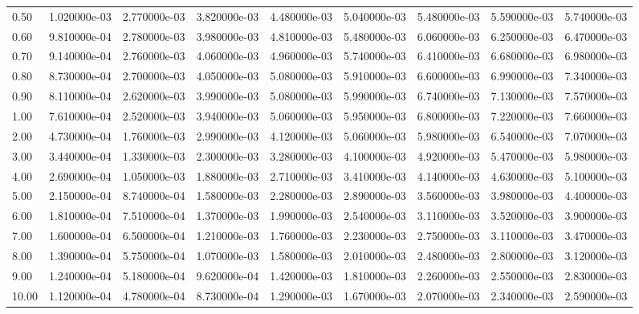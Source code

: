 \begin{tabular}{lrrrrrrrr}
0.50  &  1.020000e-03 &  2.770000e-03 &  3.820000e-03 &  4.480000e-03 &  5.040000e-03 &  5.480000e-03 &  5.590000e-03 &  5.740000e-03 \\
0.60  &  9.810000e-04 &  2.780000e-03 &  3.980000e-03 &  4.810000e-03 &  5.480000e-03 &  6.060000e-03 &  6.250000e-03 &  6.470000e-03 \\
0.70  &  9.140000e-04 &  2.760000e-03 &  4.060000e-03 &  4.960000e-03 &  5.740000e-03 &  6.410000e-03 &  6.680000e-03 &  6.980000e-03 \\
0.80  &  8.730000e-04 &  2.700000e-03 &  4.050000e-03 &  5.080000e-03 &  5.910000e-03 &  6.600000e-03 &  6.990000e-03 &  7.340000e-03 \\
0.90  &  8.110000e-04 &  2.620000e-03 &  3.990000e-03 &  5.080000e-03 &  5.990000e-03 &  6.740000e-03 &  7.130000e-03 &  7.570000e-03 \\
1.00  &  7.610000e-04 &  2.520000e-03 &  3.940000e-03 &  5.060000e-03 &  5.950000e-03 &  6.800000e-03 &  7.220000e-03 &  7.660000e-03 \\
2.00  &  4.730000e-04 &  1.760000e-03 &  2.990000e-03 &  4.120000e-03 &  5.060000e-03 &  5.980000e-03 &  6.540000e-03 &  7.070000e-03 \\
3.00  &  3.440000e-04 &  1.330000e-03 &  2.300000e-03 &  3.280000e-03 &  4.100000e-03 &  4.920000e-03 &  5.470000e-03 &  5.980000e-03 \\
4.00  &  2.690000e-04 &  1.050000e-03 &  1.880000e-03 &  2.710000e-03 &  3.410000e-03 &  4.140000e-03 &  4.630000e-03 &  5.100000e-03 \\
5.00  &  2.150000e-04 &  8.740000e-04 &  1.580000e-03 &  2.280000e-03 &  2.890000e-03 &  3.560000e-03 &  3.980000e-03 &  4.400000e-03 \\
6.00  &  1.810000e-04 &  7.510000e-04 &  1.370000e-03 &  1.990000e-03 &  2.540000e-03 &  3.110000e-03 &  3.520000e-03 &  3.900000e-03 \\
7.00  &  1.600000e-04 &  6.500000e-04 &  1.210000e-03 &  1.760000e-03 &  2.230000e-03 &  2.750000e-03 &  3.110000e-03 &  3.470000e-03 \\
8.00  &  1.390000e-04 &  5.750000e-04 &  1.070000e-03 &  1.580000e-03 &  2.010000e-03 &  2.480000e-03 &  2.800000e-03 &  3.120000e-03 \\
9.00  &  1.240000e-04 &  5.180000e-04 &  9.620000e-04 &  1.420000e-03 &  1.810000e-03 &  2.260000e-03 &  2.550000e-03 &  2.830000e-03 \\
10.00 &  1.120000e-04 &  4.780000e-04 &  8.730000e-04 &  1.290000e-03 &  1.670000e-03 &  2.070000e-03 &  2.340000e-03 &  2.590000e-03 \\
\bottomrule
\end{tabular}
